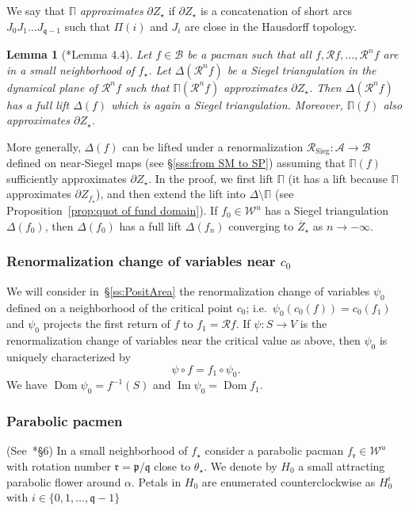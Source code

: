 \documentclass{amsart}
\newcommand{\Dom}{\operatorname {Dom}}
\newcommand{\1}{{\mathbb 1 }}
\renewcommand{\Im}{\operatorname {Im}}
\newcommand{\bDelta}{{\mathbb{\Delta}}}
\newcommand{\bPi}{{\mathbb{\Pi}}}
\newcommand\RR{\mathcal{R}}
\newcommand{\str}{{\star}}
\newcommand{\pp}{\mathfrak{p}}
\renewcommand{\qq}{\mathfrak{q}}
\newcommand{\rr}{\mathfrak{r}}
\newcommand\WW{\mathcal{W}}
\newcommand\BB{\mathcal{B}}
\renewcommand\AA{\mathcal{A}}
\newcommand\Sieg{{\operatorname{Sieg}}}
\newtheorem{lem}[thm]{Lemma}
\theoremstyle{remark}
\numberwithin{equation}{section}
\theoremstyle{definition}
\theoremstyle{nonumberbreak}
\begin{document}
We say that $\bPi$ \emph{approximates} $\partial Z_\str$ if $\partial Z_\str$ is a concatenation of short arcs $J_0J_1\dots J_{\qq-1}$ such that $\Pi(i)$ and $J_i$ are close in the Hausdorff topology.


\begin{lem}[\cite{DLS}*{Lemma 4.4}]
\label{lem:SiegTriangLifting}
Let $f\in \BB$ be a pacman such that all $f,\RR f,\dots, \RR^n f$ are in  a small neighborhood of $f_\str$. Let $\bDelta(\RR^n f)$ be a Siegel triangulation in the dynamical plane of $\RR^n f$ such that $\bPi(\RR^n f)$ approximates $\partial Z_\str$. Then $\bDelta(\RR^n f)$ has a full lift $\bDelta(f)$ which is again a Siegel triangulation. Moreover, $\bPi(f)$ also approximates $\partial Z_\str$.
\end{lem}
\noindent More generally, $\bDelta(f)$ can be lifted under a renormalization $\RR_\Sieg\colon\AA\to \BB$ defined on near-Siegel maps (see \S\ref{sss:from SM to SP}) assuming that $\bPi(f)$ sufficiently approximates $\partial Z_\str$. In the proof, we first lift $\bPi$ (it has a lift because  $\bPi$  approximates $\partial Z_{f_\str}$), and then extend the lift into $\bDelta\setminus \bPi$ (see Proposition~\ref{prop:quot of fund domain}). If $f_0\in \WW^u$ has a Siegel triangulation $\bDelta(f_0)$, then $\bDelta( f_0)$ has a full lift $\bDelta(f_n)$ converging to $\overline Z_\str$ as $n\to -\infty$. 


\subsubsection{Renormalization change of variables near $c_0$}
\label{sss:CofV near c_0}
We will consider in~\S\ref{ss:PositArea} the renormalization change of variables $\psi_0$ defined on a neighborhood of the critical point $c_0$; i.e.~$\psi_0(c_0(f))=c_0(f_1)$ and $\psi_0$ projects the first return of $f$ to $f_1=\RR f$. If $\psi\colon S\to V$ is the renormalization change of variables near the critical value as above, then $\psi_0$ is uniquely characterized by
 \[ \psi \circ f = f_1 \circ \psi_0.\] 
We have $\Dom \psi_0=f^{-1} (S)$ and $\Im \psi_0= \Dom f_1$. 


\subsubsection{Parabolic pacmen}(See~\cite{DLS}*{\S 6})
\label{sss:par pacmen}
In a small neighborhood of $f_\str$ consider a parabolic pacman $f_\rr\in \WW^u$ with rotation number $\rr=\pp/\qq$ close to $\theta_\str$. We denote by $H_0$ a small attracting parabolic flower around $\alpha$. Petals in $H_0$ are enumerated counterclockwise as $H^i_0$ with $i\in \{0,1,\dots, \qq-1\}$
\end{document}
